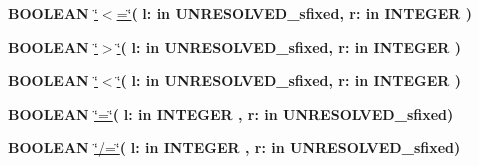 \begin{DoxyCompactItemize}
\item 
{\bfseries {\bfseries \textcolor{comment}{B\+O\+O\+L\+E\+A\+N}\textcolor{vhdlchar}{ }}} \hyperlink{classfixed__pkg_a65b73a94d4fe541a941f431175b342b7}{\char`\"{}$<$=\char`\"{}}{\bfseries  ( }{\bfseries \textcolor{vhdlchar}{l\+: }\textcolor{stringliteral}{in }\textcolor{vhdlchar}{U\+N\+R\+E\+S\+O\+L\+V\+E\+D\+\_\+sfixed}}{\bfseries  , \textcolor{vhdlchar}{r\+: }\textcolor{stringliteral}{in }{\bfseries \textcolor{comment}{I\+N\+T\+E\+G\+E\+R}\textcolor{vhdlchar}{ }}}{\bfseries  )} 
\item 
{\bfseries {\bfseries \textcolor{comment}{B\+O\+O\+L\+E\+A\+N}\textcolor{vhdlchar}{ }}} \hyperlink{classfixed__pkg_ac6c82329bf849852be997a3d0a737cf9}{\char`\"{}$>$\char`\"{}}{\bfseries  ( }{\bfseries \textcolor{vhdlchar}{l\+: }\textcolor{stringliteral}{in }\textcolor{vhdlchar}{U\+N\+R\+E\+S\+O\+L\+V\+E\+D\+\_\+sfixed}}{\bfseries  , \textcolor{vhdlchar}{r\+: }\textcolor{stringliteral}{in }{\bfseries \textcolor{comment}{I\+N\+T\+E\+G\+E\+R}\textcolor{vhdlchar}{ }}}{\bfseries  )} 
\item 
{\bfseries {\bfseries \textcolor{comment}{B\+O\+O\+L\+E\+A\+N}\textcolor{vhdlchar}{ }}} \hyperlink{classfixed__pkg_a5d059cf3277e3585e4f3f076db10b273}{\char`\"{}$<$\char`\"{}}{\bfseries  ( }{\bfseries \textcolor{vhdlchar}{l\+: }\textcolor{stringliteral}{in }\textcolor{vhdlchar}{U\+N\+R\+E\+S\+O\+L\+V\+E\+D\+\_\+sfixed}}{\bfseries  , \textcolor{vhdlchar}{r\+: }\textcolor{stringliteral}{in }{\bfseries \textcolor{comment}{I\+N\+T\+E\+G\+E\+R}\textcolor{vhdlchar}{ }}}{\bfseries  )} 
\item 
{\bfseries {\bfseries \textcolor{comment}{B\+O\+O\+L\+E\+A\+N}\textcolor{vhdlchar}{ }}} \hyperlink{classfixed__pkg_a7949e9258ea0749e3b35961feea8db87}{\char`\"{}=\char`\"{}}{\bfseries  ( }{\bfseries \textcolor{vhdlchar}{l\+: }\textcolor{stringliteral}{in }{\bfseries \textcolor{comment}{I\+N\+T\+E\+G\+E\+R}\textcolor{vhdlchar}{ }}}{\bfseries  , \textcolor{vhdlchar}{r\+: }\textcolor{stringliteral}{in }\textcolor{vhdlchar}{U\+N\+R\+E\+S\+O\+L\+V\+E\+D\+\_\+sfixed}}{\bfseries  )} 
\item 
{\bfseries {\bfseries \textcolor{comment}{B\+O\+O\+L\+E\+A\+N}\textcolor{vhdlchar}{ }}} \hyperlink{classfixed__pkg_a00087aded97b434060226b9ba63a9077}{\char`\"{}/=\char`\"{}}{\bfseries  ( }{\bfseries \textcolor{vhdlchar}{l\+: }\textcolor{stringliteral}{in }{\bfseries \textcolor{comment}{I\+N\+T\+E\+G\+E\+R}\textcolor{vhdlchar}{ }}}{\bfseries  , \textcolor{vhdlchar}{r\+: }\textcolor{stringliteral}{in }\textcolor{vhdlchar}{U\+N\+R\+E\+S\+O\+L\+V\+E\+D\+\_\+sfixed}}{\bfseries  )} 

\end{DoxyCompactItemize}
